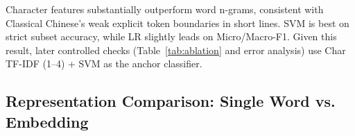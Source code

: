 \documentclass[11pt]{article}
\begin{document}
\begin{table}[t]
\centering
\small
{}
\caption{18-label multi-label results (group split by poem, 3 seeds).}
\label{tab:baseline_main}
\end{table}

Character features substantially outperform word n-grams, consistent with Classical Chinese's weak explicit token boundaries in short lines.
SVM is best on strict subset accuracy, while LR slightly leads on Micro/Macro-F1.
Given this result, later controlled checks (Table~\ref{tab:ablation} and error analysis) use Char TF-IDF (1--4) + SVM as the anchor classifier.

\subsection{Representation Comparison: Single Word vs. Embedding}

\begin{table}[t]
\centering
\small
{}
\caption{Prompt sensitivity of single-word outputs vs. embedding coverage.}
\label{tab:repr_compare}
\end{table}
\end{document}

